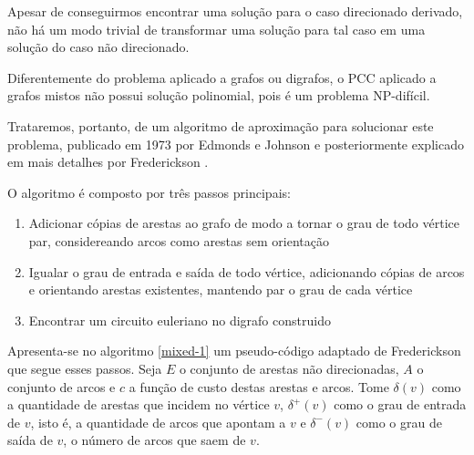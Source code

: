     Apesar de conseguirmos encontrar uma solução para o caso direcionado derivado, não há um modo trivial de transformar uma solução para tal caso em uma solução do caso não direcionado.

    Diferentemente do problema aplicado a grafos ou digrafos, o PCC aplicado a grafos mistos não possui solução polinomial, pois é um problema NP-difícil. 




    Trataremos, portanto, de um algoritmo de aproximação para solucionar este problema, publicado em 1973 por Edmonds e Johnson \cite{edmonds-johnson} e posteriormente explicado em mais detalhes por Frederickson \cite{frederickson}. 

    O algoritmo é composto por três passos principais:

    \begin{enumerate}
        \item Adicionar cópias de arestas ao grafo de modo a tornar o grau de todo vértice par, considereando arcos como arestas sem orientação
        \item Igualar o grau de entrada e saída de todo vértice, adicionando cópias de arcos e orientando arestas existentes, mantendo par o grau de cada vértice
        \item Encontrar um circuito euleriano no digrafo construido
    \end{enumerate}
    

    Apresenta-se no algoritmo \ref{mixed-1} um pseudo-código adaptado de Frederickson \cite{frederickson} que segue esses passos.
    Seja $E$ o conjunto de arestas não direcionadas, $A$ o conjunto de arcos e $c$ a função de custo destas arestas e arcos.
    Tome $\delta(v)$ como a quantidade de arestas que incidem no vértice $v$, $\delta^+(v)$ como o grau de entrada de $v$, isto é, a quantidade de arcos que apontam a $v$ e $\delta^-(v)$ como o grau de saída de $v$, o número de arcos que saem de $v$.

